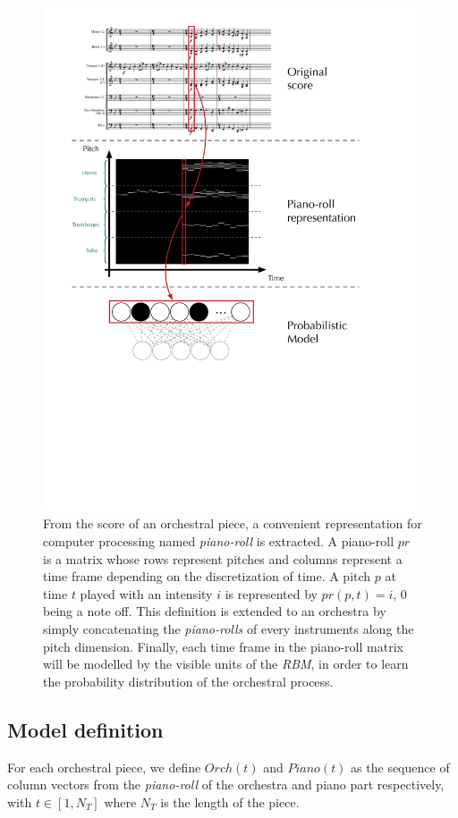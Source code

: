 \documentclass[letterpaper]{article}
\begin{document}
\begin{figure}[ht]
\centering
\includegraphics[scale=0.35]{data_representation}
\caption{From the score of an orchestral piece, a convenient representation for computer processing named \textit{piano-roll} is extracted. A piano-roll $pr$ is a matrix whose rows represent pitches and columns represent a time frame depending on the discretization of time. A pitch $p$ at time $t$ played with an intensity $i$ is represented by $pr(p,t) = i$, $0$ being a note off. This definition is extended to an orchestra by simply concatenating the \textit{piano-rolls} of every instruments along the pitch dimension.
Finally, each time frame in the piano-roll matrix will be modelled by the visible units of the \textit{RBM}, in order to learn the probability distribution of the orchestral process.}
\label{fig:piano-roll}
\end{figure}

\subsection{Model definition}
For each orchestral piece, we define $Orch(t)$ and $Piano(t)$ as the sequence of column vectors from the \textit{piano-roll} of the orchestra and piano part respectively, with $t \in \left[ 1,N_{T} \right]$ where $N_{T}$ is the length of the piece.
\end{document}

